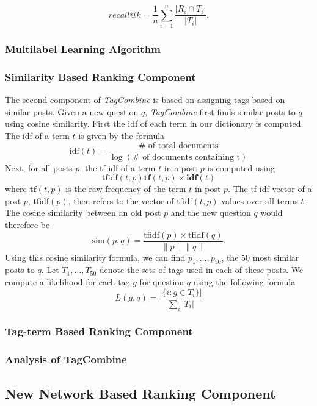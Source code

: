 \documentclass[10pt]{IEEEtran}
\begin{document}
\[recall@k = \frac{1}{n}\sum\limits_{i=1}^{n}\frac{|R_i \cap T_i|}{|T_i|}.\]

\subsubsection{Multilabel Learning Algorithm}

\subsubsection{Similarity Based Ranking Component}

The second component of \textit{TagCombine} is based on assigning tags based on similar posts. Given a new question $q$, \textit{TagCombine} first finds similar posts to $q$ using cosine similarity. First the idf of each term in our dictionary is computed. The idf of a term $t$ is given by the formula
\[ \text{idf}(t) = \frac{\# \text{ of total documents}}{\log (\# \text{ of documents containing t} )} \]
Next, for all posts $p$, the tf-idf of a term $t$ in a post $p$ is computed using
\[ \text{tfidf}(t,p) \mathbf{tf}(t, p) \times \mathbf{idf}(t)\]
where $\mathbf{tf}(t, p)$ is the raw frequency of the term $t$ in post $p$. The tf-idf vector of a post $p$, $\text{tfidf}(p)$, then refers to the vector of $\text{tfidf}(t,p)$ values over all terms $t$. The cosine similarity between an old post $p$ and the new question $q$ would therefore be
\[ \text{sim}(p, q) = \frac{\text{tfidf}(p) \times \text{tfidf}(q)}{\|p\| \|q\|}.\]
Using this cosine similarity formula, we can find $p_1, \ldots, p_{50}$, the $50$ most similar posts to $q$. Let $T_1, \ldots, T_{50}$ denote the sets of tags used in each of these posts. We compute a likelihood for each tag $g$ for question $q$ using the following formula
\[ L(g, q) = \frac{ |\{i : g \in T_i \} | }{\sum_i  |T_i |}\]


\subsubsection{Tag-term Based Ranking Component}

\subsubsection{Analysis of TagCombine}

\subsection{New Network Based Ranking Component}
\end{document}
